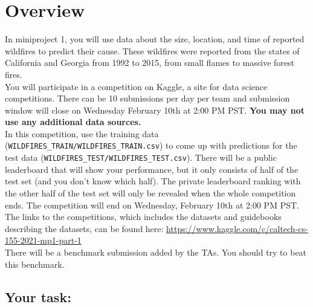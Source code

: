\newif\ifshowsolutions
\showsolutionstrue




\pagestyle{fancy}

\section{Overview}

\noindent In miniproject 1, you will use data about the size, location, and time of reported wildfires to predict their cause. These wildfires were reported from the states of California and Georgia from 1992 to 2015, from small flames to massive forest fires.\\

\noindent You will participate in a competition on Kaggle, a site for data science competitions. There can be 10 submissions per day per team and submission window will close on Wednesday February 10th at 2:00 PM PST. \textbf{You may not use any additional data sources.}\\

\noindent In this competition, use the training data (\texttt{WILDFIRES_TRAIN/WILDFIRES_TRAIN.csv}) to come up with predictions for the test data (\texttt{WILDFIRES_TEST/WILDFIRES_TEST.csv}). There will be a public leaderboard that will show your performance, but it only consists of half of the test set (and you don't know which half). The private leaderboard ranking with the other half of the test set will only be revealed when the whole competition ends. The competition will end on Wednesday, February 10th at 2:00 PM PST.\\

\noindent The links to the competitions, which includes the datasets and guidebooks describing the datasets, can be found here: \url{https://www.kaggle.com/c/caltech-cs-155-2021-mp1-part-1}\\

\noindent There will be a benchmark submission added by the TAs.  You should try to beat this benchmark.

\subsection{Your task:}

